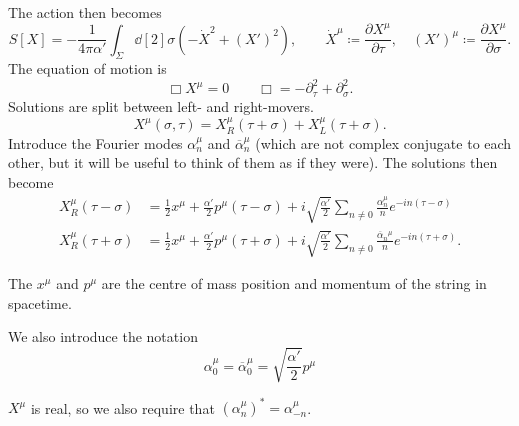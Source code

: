 The action then becomes
\begin{equation}
  S[X] = -\frac{1}{4 \pi \alpha'} \int_\Sigma \dd[2]{\sigma} \left( - \dot{X}^2 + (X')^2 \right), \qquad \dot{X}^{\mu} \coloneqq \frac{\partial X^{\mu}}{\partial \tau}, \quad (X')^{\mu} \coloneqq \frac{\partial X^{\mu}}{\partial \sigma}.
\end{equation}
The equation of motion is
\begin{equation}
  \Box X^{\mu} = 0 \qquad \Box = - \partial_\tau^2 + \partial^2_\sigma.
\end{equation}
Solutions are split between left- and right-movers.
\begin{equation}
  X^{\mu}(\sigma, \tau) = X^{\mu}_R(\tau + \sigma) + X_L^{\mu}(\tau + \sigma).
\end{equation}
Introduce the Fourier modes $\alpha^{\mu}_n$  and $\overline{\alpha}^{\mu}_n$  (which are not complex conjugate to each other, but it will be useful to think of them as if they were).
The solutions then become
\begin{align}
  X^{\mu}_R(\tau - \sigma) &= \frac{1}{2} x^{\mu} + \frac{\alpha'}{2} p^{\mu} (\tau - \sigma) + i \sqrt{\frac{\alpha'}{2}} \sum_{n \neq 0} \frac{\alpha_n^{\mu}}{n} e^{-i n (\tau - \sigma)} \\
  X^{\mu}_R(\tau + \sigma) &= \frac{1}{2} x^{\mu} + \frac{\alpha'}{2} p^{\mu} (\tau + \sigma) + i \sqrt{\frac{\alpha'}{2}} \sum_{n \neq 0} \frac{\overline{\alpha}_n{}^{\mu}}{n} e^{-i n (\tau + \sigma)}.
\end{align}

The $x^{\mu}$  and $p^{\mu}$  are the centre of mass position and momentum of the string in spacetime.

\begin{notation}[]
  We also introduce the notation 
  \begin{equation}
    \alpha_0^{\mu} = \overline{\alpha}_0^{\mu} = \sqrt{\frac{\alpha'}{2}} p^{\mu}
  \end{equation}
\end{notation}

$X^{\mu}$ is real, so we also require that $(\alpha_n^{\mu})^* = \alpha^{\mu}_{-n}$.
